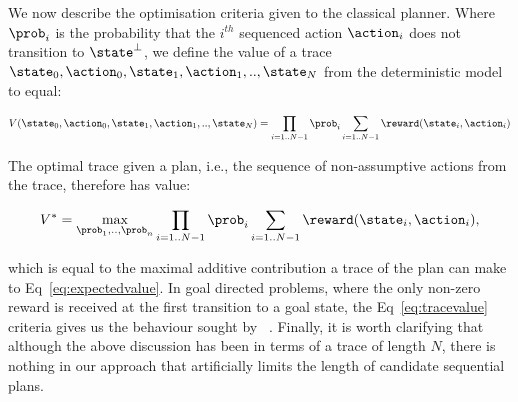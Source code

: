 








We now describe the optimisation criteria given to the classical
planner. Where $\prob_i$ is the probability that the $i^{th}$
sequenced action $\action_i$ does not transition to $\state^\bot$, we
define the value of a trace
$\state_0, \action_0, \state_1, \action_1,.., \state_N$ from the
deterministic model to equal:

\begin{equation}\label{eq:tracevalue}
V(\state_0, \action_0, \state_1, \action_1,.., \state_N) =  \prod_{i=1..N-1} \prob_i \sum_{i=1..N-1} \reward(\state_i, \action_i)
\end{equation}

\noindent The optimal trace given a plan, i.e., the sequence of non-assumptive
actions from the trace, therefore has value:

\[
V^* = \max_{\prob_1, .., \prob_n} \prod_{i=1..N-1} \prob_i \sum_{i=1..N-1}
\reward(\state_i, \action_i),
\]

\noindent which is equal to the maximal 
additive contribution a trace of the plan can make to
Eq~\ref{eq:expectedvalue}.  In goal directed problems, where the only
non-zero reward is received at the first transition to a goal state,
the Eq~\ref{eq:tracevalue} criteria gives us the behaviour sought
by ~\cite{yoon:etal:2007}. Finally, it is
worth clarifying that although the above discussion has been in terms
of a trace of length $N$, there is nothing in our approach that
artificially limits the length of candidate sequential plans.


